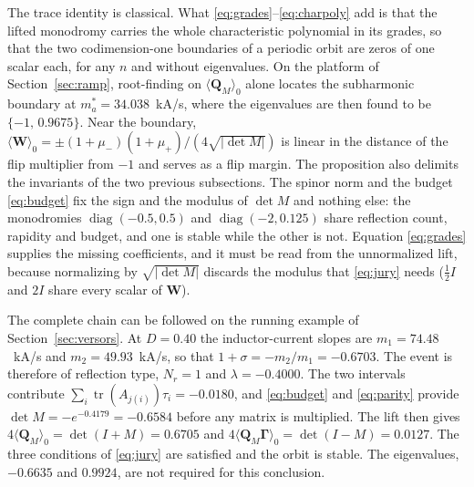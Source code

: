 \documentclass[journal]{IEEEtran}
\begin{document}
The trace identity is classical. What \eqref{eq:grades}--\eqref{eq:charpoly}
add is that the lifted monodromy carries the whole characteristic polynomial
in its grades, so that the two codimension-one boundaries of a periodic orbit
are zeros of one scalar each, for any $n$ and without eigenvalues. On the
platform of Section~\ref{sec:ramp}, root-finding on
$\langle\bm{Q}_M\rangle_0$ alone locates the subharmonic boundary at
$m_a^{*}=34.038$~kA/s, where the eigenvalues are then found to be
$\{-1,\,0.9675\}$. Near the boundary,
$\langle\bm{W}\rangle_0=\pm(1+\mu_-)(1+\mu_+)/(4\sqrt{\lvert\det M\rvert})$ is
linear in the distance of the flip multiplier from $-1$ and serves as a flip
margin. The proposition also delimits the invariants of the two previous
subsections. The spinor norm and the budget \eqref{eq:budget} fix the sign
and the modulus of $\det M$ and nothing else: the monodromies
$\operatorname{diag}(-0.5,0.5)$ and $\operatorname{diag}(-2,0.125)$ share
reflection count, rapidity and budget, and one is stable while the other is
not. Equation \eqref{eq:grades} supplies the missing coefficients, and it
must be read from the unnormalized lift, because normalizing by
$\sqrt{\lvert\det M\rvert}$ discards the modulus that \eqref{eq:jury} needs
($\tfrac12I$ and $2I$ share every scalar of $\bm{W}$).

The complete chain can be followed on the running example of
Section~\ref{sec:versors}. At $D=0.40$ the inductor-current slopes are
$m_1=74.48$~kA/s and $m_2=49.93$~kA/s, so that $1+\sigma=-m_2/m_1=-0.6703$.
The event is therefore of reflection type, $N_r=1$ and $\lambda=-0.4000$.
The two intervals contribute $\sum_i\operatorname{tr}(A_{j(i)})\tau_i=-0.0180$,
and \eqref{eq:budget} and \eqref{eq:parity} provide
$\det M=-e^{-0.4179}=-0.6584$ before any matrix is multiplied. The lift then
gives $4\langle\bm{Q}_M\rangle_0=\det(I+M)=0.6705$ and
$4\langle\bm{Q}_M\bm{\Gamma}\rangle_0=\det(I-M)=0.0127$. The three conditions
of \eqref{eq:jury} are satisfied and the orbit is stable. The eigenvalues,
$-0.6635$ and $0.9924$, are not required for this conclusion.
\end{document}
